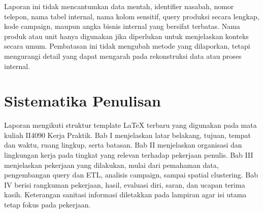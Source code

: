 Laporan ini tidak mencantumkan data mentah, identifier nasabah, nomor telepon, nama tabel internal, nama kolom sensitif, query produksi secara lengkap, kode campaign, maupun angka bisnis internal yang bersifat terbatas. Nama produk atau unit hanya digunakan jika diperlukan untuk menjelaskan konteks secara umum. Pembatasan ini tidak mengubah metode yang dilaporkan, tetapi mengurangi detail yang dapat mengarah pada rekonstruksi data atau proses internal.

\section{Sistematika Penulisan}
Laporan mengikuti struktur template LaTeX terbaru yang digunakan pada mata kuliah II4090 Kerja Praktik. Bab I menjelaskan latar belakang, tujuan, tempat dan waktu, ruang lingkup, serta batasan. Bab II menjelaskan organisasi dan lingkungan kerja pada tingkat yang relevan terhadap pekerjaan penulis. Bab III menjelaskan pekerjaan yang dilakukan, mulai dari pemahaman data, pengembangan query dan ETL, analisis campaign, sampai spatial clustering. Bab IV berisi rangkuman pekerjaan, hasil, evaluasi diri, saran, dan ucapan terima kasih. Keterangan sanitasi informasi diletakkan pada lampiran agar isi utama tetap fokus pada pekerjaan.
